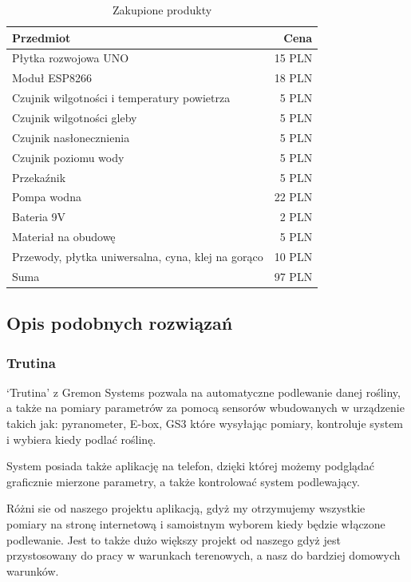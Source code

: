 \documentclass[12pt]{article}
\begin{document}
\begin{table}[!h]
\centering
\begin{tabular}{l|r}
Przedmiot & Cena \\\hline

Płytka rozwojowa UNO & 15 PLN \\

Moduł ESP8266 & 18 PLN \\

Czujnik wilgotności i temperatury powietrza & 5 PLN \\

Czujnik wilgotności gleby & 5 PLN \\

Czujnik nasłonecznienia & 5 PLN \\

Czujnik poziomu wody & 5 PLN \\

Przekaźnik & 5 PLN \\

Pompa wodna & 22 PLN \\

Bateria 9V & 2 PLN \\

Materiał na obudowę & 5 PLN \\

Przewody, płytka uniwersalna, cyna, klej na gorąco & 10 PLN 
\\ \hline
Suma & 97 PLN

\end{tabular}
\caption{\label{tab:widgets}Zakupione produkty}
\end{table}
\newpage
\subsection{Opis podobnych rozwiązań }
\subsubsection{Trutina}
‘Trutina’ z Gremon Systems pozwala na automatyczne podlewanie danej rośliny, a także na pomiary parametrów za pomocą sensorów wbudowanych w urządzenie takich jak: pyranometer, E-box, GS3 które wysyłając pomiary, kontroluje system i wybiera kiedy podlać roślinę. 

System posiada także aplikację na telefon, dzięki której możemy podglądać graficznie mierzone parametry, a także kontrolować system podlewający. 


Różni sie od naszego projektu aplikacją, gdyż my otrzymujemy wszystkie pomiary na stronę internetową i samoistnym wyborem kiedy będzie włączone podlewanie. Jest to także dużo większy projekt od naszego gdyż jest przystosowany do pracy w warunkach terenowych, a nasz do bardziej domowych warunków.
\end{document}
